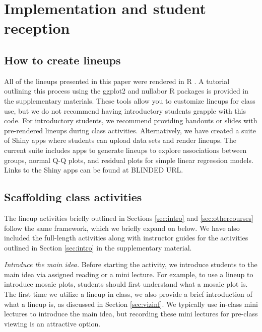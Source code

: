\documentclass[12pt]{article}
\begin{document}
\hypertarget{implementation-and-student-reception}{%
\section{Implementation and student
reception}\label{implementation-and-student-reception}}

\label{sec:implement}

\hypertarget{how-to-create-lineups}{%
\subsection{How to create lineups}\label{how-to-create-lineups}}

All of the lineups presented in this paper were rendered in R \citep{r}.
A tutorial outlining this process using the ggplot2 \citep{ggplot2} and
nullabor \citep{nullabor} R packages is provided in the supplementary
materials. These tools allow you to customize lineups for class use, but
we do not recommend having introductory students grapple with this code.
For introductory students, we recommend providing handouts or slides
with pre-rendered lineups during class activities. Alternatively, we
have created a suite of Shiny apps \citep{shiny} where students can
upload data sets and render lineups. The current suite includes apps to
generate lineups to explore associations between groups, normal Q-Q
plots, and residual plots for simple linear regression models. Links to
the Shiny apps can be found at BLINDED URL.

\hypertarget{scaffolding-class-activities}{%
\subsection{Scaffolding class
activities}\label{scaffolding-class-activities}}

The lineup activities briefly outlined in Sections \ref{sec:intro} and
\ref{sec:othercourses} follow the same framework, which we briefly
expand on below. We have also included the full-length activities along
with instructor guides for the activities outlined in Section
\ref{sec:intro} in the supplementary material.

\emph{Introduce the main idea.} Before starting the activity, we
introduce students to the main idea via assigned reading or a mini
lecture. For example, to use a lineup to introduce mosaic plots,
students should first understand what a mosaic plot is. The first time
we utilize a lineup in class, we also provide a brief introduction of
what a lineup is, as discussed in Section \ref{sec:vizinf}. We typically
use in-class mini lectures to introduce the main idea, but recording
these mini lectures for pre-class viewing is an attractive option.
\end{document}
